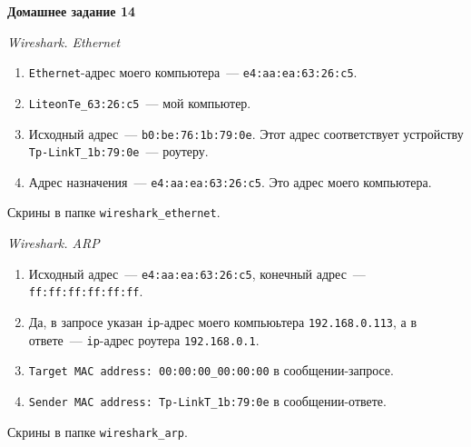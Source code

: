 \documentclass[12pt]{article}
\def\THEME{Домашнее задание 14}
\begin{document}
\begin{center}
\vspace*{0mm}
{\LARGE \bf \THEME}
\end{center}

\begin{center}
{\Large \it Wireshark. Ethernet}
\end{center}

\begin{enumerate}

\item \texttt{Ethernet}-адрес моего компьютера~--- \texttt{e4:aa:ea:63:26:c5}.

\item \texttt{LiteonTe\_63:26:c5}~--- мой компьютер.

\item Исходный адрес~--- \texttt{b0:be:76:1b:79:0e}. Этот адрес соответствует устройству \texttt{Tp-LinkT\_1b:79:0e}~--- роутеру.

\item Адрес назначения~--- \texttt{e4:aa:ea:63:26:c5}. Это адрес моего компьютера.

\end{enumerate}

Скрины в папке \texttt{wireshark\_ethernet}.

\begin{center}
{\Large \it Wireshark. ARP}
\end{center}

\begin{enumerate}

\item Исходный адрес~--- \texttt{e4:aa:ea:63:26:c5}, конечный адрес~--- \texttt{ff:ff:ff:ff:ff:ff}.

\item Да, в запросе указан \texttt{ip}-адрес моего компьюьтера \texttt{192.168.0.113}, а в ответе~--- \texttt{ip}-адрес роутера \texttt{192.168.0.1}.

\item \texttt{Target MAC address: 00:00:00\_00:00:00} в сообщении-запросе.

\item \texttt{Sender MAC address: Tp-LinkT\_1b:79:0e} в сообщении-ответе.

\end{enumerate}

Скрины в папке \texttt{wireshark\_arp}.
\end{document}
